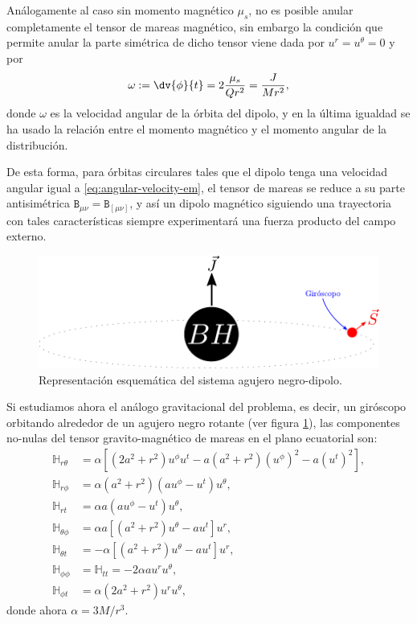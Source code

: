 Análogamente al caso sin momento magnético $\mu_s$, no es posible anular completamente el tensor de mareas magnético, sin embargo la condición que permite anular la parte simétrica de dicho tensor viene dada por $u^r=u^{\theta}=0$ y por
\begin{equation}
\label{eq:angular-velocity-em}
\omega := \dv{\phi}{t} = 2 \frac{\mu_s}{Q r^2} = \frac{J}{Mr^2},
\end{equation}
donde $\omega$ es la velocidad angular de la órbita del dipolo, y en la última igualdad se ha usado la relación entre el momento magnético y el momento angular de la distribución.

De esta forma, para órbitas circulares tales que el dipolo tenga una velocidad angular igual a \eqref{eq:angular-velocity-em}, el tensor de mareas se reduce a su parte antisimétrica $\mathtt{B}_{\mu \nu} = \mathtt{B}_{[\mu \nu]}$, y así un dipolo magnético siguiendo una trayectoria con tales características siempre experimentará una fuerza producto del campo externo.

\begin{figure}[!ht]
\centering
\includegraphics[scale=0.9]{images/solucion-en-kerr.pdf}
\caption[Solución helicoidal en Kerr]{Representación esquemática del sistema agujero negro-dipolo.}
\label{fig:7}
\end{figure}

Si estudiamos ahora el análogo gravitacional del problema, es decir, un giróscopo orbitando alrededor de un agujero negro rotante (ver figura \ref{fig:7}), las componentes no-nulas del tensor gravito-magnético de mareas en el plano ecuatorial son:
\begin{align}
\mathbb{H}_{r \theta} &= \alpha \left[\left(2a^2+r^2\right) u^{\phi} u^t - a\left( a^2+r^2 \right) \left( u^{\phi} \right)^2 - a\left( u^t \right)^2  \right],\\
\mathbb{H}_{r \phi} &= \alpha \left( a^2+r^2 \right) \left( au^{\phi} - u^t \right)u^{\theta},\\
\mathbb{H}_{r t} &= \alpha a \left( au^{\phi} - u^t \right)u^{\theta},\\
\mathbb{H}_{\theta \phi} &= \alpha a \left[ \left( a^2+r^2 \right) u^{\theta} - au^t \right] u^r,\\
\mathbb{H}_{\theta t} &= -\alpha \left[ \left( a^2+r^2 \right) u^{\theta} - au^t \right] u^r,\\
\mathbb{H}_{\phi \phi} &= \mathbb{H}_{tt} = -2\alpha a u^r u^{\theta}, \\
\mathbb{H}_{\phi t} &= \alpha \left( 2a^2 + r^2 \right) u^r u^{\theta},
\end{align}
donde ahora $\alpha= 3M/r^3$.

